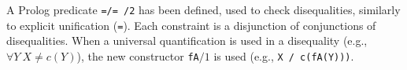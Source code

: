 \documentclass{llncs}
\begin{document}







A Prolog predicate {\tt =/= /2} \cite{SusanaPADL2000} has been
defined, used to check disequalities, similarly to explicit
unification ({\tt =}). Each constraint is a disjunction of
conjunctions of disequalities. When a universal quantification is used in a disequality (e.g.,
$\forall Y~ X \neq c(Y)$), the new constructor {\tt fA}$/1$ is used
(e.g., {\tt X / c(fA(Y)))}.  


\end{document}
